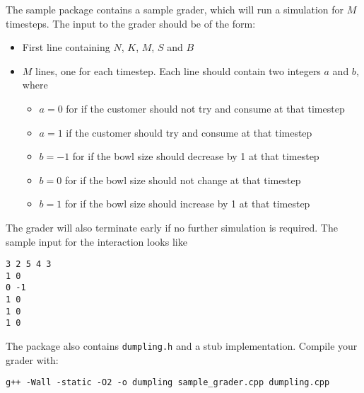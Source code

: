 \documentclass{article}
\begin{document}
The sample package contains a sample grader, which will run a simulation for $M$ timesteps. The input to the grader should be of the form:
\begin{itemize}
\item First line containing $N$, $K$, $M$, $S$ and $B$
\item $M$ lines, one for each timestep. Each line should contain two integers $a$ and $b$, where
\begin{itemize}
\item $a = 0$ for if the customer should not try and consume at that timestep
\item $a = 1$ if the customer should try and consume at that timestep
\item $b=-1$ for if the bowl size should decrease by 1 at that timestep
\item $b=0$ for if the bowl size should not change at that timestep
\item $b=1$ for if the bowl size should increase by 1 at that timestep
\end{itemize}
\end{itemize}

The grader will also terminate early if no further simulation is required. The sample input for the interaction looks like

\begin{verbatim}
3 2 5 4 3
1 0
0 -1
1 0
1 0
1 0
\end{verbatim}

The package also contains {\tt dumpling.h} and a stub implementation. Compile your grader with:

\begin{verbatim}
g++ -Wall -static -O2 -o dumpling sample_grader.cpp dumpling.cpp
\end{verbatim}
\end{document}
